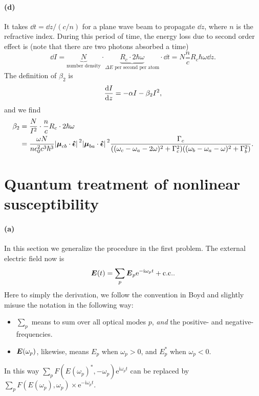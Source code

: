 \documentclass[hyperref, a4paper]{article}
\newcommand*{\ii}{\mathrm{i}}
\newcommand*{\ee}{\mathrm{e}}
\begin{document}
\paragraph*{(d)} It takes $\dd{t} = \dd{z} / (c / n)$ for a plane wave beam to propagate $\dd{z}$,
where $n$ is the refractive index.
During this period of time, the energy loss due to second order effect is 
(note that there are two photons absorbed a time)
\begin{equation}
    \dd{I} = \underbrace{N}_{\text{number density}} 
    \cdot \underbrace{R_c \cdot 2 \hbar \omega}_{\text{$\Delta E$ per second per atom}} \cdot \dd{t}
    = N \frac{n}{c} R_c \hbar \omega \dd{z}.
\end{equation}
The definition of $\beta_2$ is 
\begin{equation}
    \dv{I}{z} = - \alpha I - \beta_2 I^2,
\end{equation}
and we find 
\begin{equation}
    \begin{aligned}
        \beta_2 &= \frac{N}{I^2} \cdot \frac{n}{c} R_c \cdot 2 \hbar \omega \\
        &= \frac{\omega N}{n \epsilon_0^2 c^3 \hbar^3} 
        \abs*{\vb*{\mu}_{cb} \cdot \vu*{\epsilon}}^2 
        \abs*{\vb*{\mu}_{ba} \cdot \vu*{\epsilon}}^2
        \frac{\Gamma_c}{
            ((\omega_c - \omega_a - 2 \omega)^2 + \Gamma_c^2 )
            ((\omega_b - \omega_a - \omega)^2 + \Gamma_b^2)
        }.
    \end{aligned}
\end{equation}

\section{Quantum treatment of nonlinear susceptibility}

\paragraph*{(a)} In this section we generalize the procedure in the first problem.
The external electric field now is  
\begin{equation}
    \vb*{E}(t) = \sum_p \vb*{E}_p \ee^{- \ii \omega_p t} + \text{c.c.}.
\end{equation}
Here to simply the derivation, 
we follow the convention in Boyd and slightly misuse the notation in the following way:
\begin{itemize}
    \item $\sum_p$ means to sum over all optical modes $p$, 
    \emph{and} the positive- and negative-frequencies.
    \item $\vb*{E}(\omega_p)$, likewise, means 
    $E_p$ when $\omega_p > 0$, 
    and $E_p^*$ when $\omega_p < 0$.
\end{itemize}
In this way $\sum_p F(E(\omega_p)^*, - \omega_p) \ee^{\ii \omega_p t}$
can be replaced by $\sum_p F(E(\omega_p), \omega_p) \times \ee^{- \ii \omega_p t}$.
\end{document}
